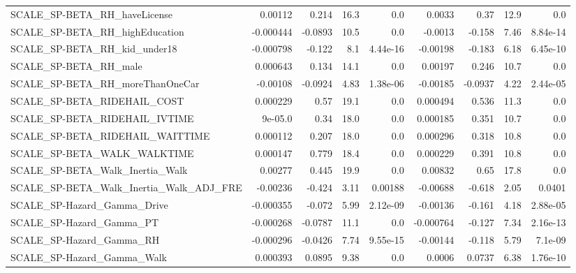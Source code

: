 \begin{tabular}{lrrrrrrrr}
SCALE\_SP-BETA\_RH\_haveLicense                       &     0.00112 &        0.214 &     16.3 &      0.0 &     0.0033 &        0.37 &         12.9 &           0.0 \\
SCALE\_SP-BETA\_RH\_highEducation                     &   -0.000444 &      -0.0893 &     10.5 &      0.0 &    -0.0013 &      -0.158 &         7.46 &      8.84e-14 \\
SCALE\_SP-BETA\_RH\_kid\_under18                       &   -0.000798 &       -0.122 &      8.1 & 4.44e-16 &   -0.00198 &      -0.183 &         6.18 &      6.45e-10 \\
SCALE\_SP-BETA\_RH\_male                              &    0.000643 &        0.134 &     14.1 &      0.0 &    0.00197 &       0.246 &         10.7 &           0.0 \\
SCALE\_SP-BETA\_RH\_moreThanOneCar                    &    -0.00108 &      -0.0924 &     4.83 & 1.38e-06 &   -0.00185 &     -0.0937 &         4.22 &      2.44e-05 \\
SCALE\_SP-BETA\_RIDEHAIL\_COST                        &    0.000229 &         0.57 &     19.1 &      0.0 &   0.000494 &       0.536 &         11.3 &           0.0 \\
SCALE\_SP-BETA\_RIDEHAIL\_IVTIME                      &     9e-05.0 &         0.34 &     18.0 &      0.0 &   0.000185 &       0.351 &         10.7 &           0.0 \\
SCALE\_SP-BETA\_RIDEHAIL\_WAITTIME                    &    0.000112 &        0.207 &     18.0 &      0.0 &   0.000296 &       0.318 &         10.8 &           0.0 \\
SCALE\_SP-BETA\_WALK\_WALKTIME                        &    0.000147 &        0.779 &     18.4 &      0.0 &   0.000229 &       0.391 &         10.8 &           0.0 \\
SCALE\_SP-BETA\_Walk\_Inertia\_Walk                    &     0.00277 &        0.445 &     19.9 &      0.0 &    0.00832 &        0.65 &         17.8 &           0.0 \\
SCALE\_SP-BETA\_Walk\_Inertia\_Walk\_ADJ\_FRE            &    -0.00236 &       -0.424 &     3.11 &  0.00188 &   -0.00688 &      -0.618 &         2.05 &        0.0401 \\
SCALE\_SP-Hazard\_Gamma\_Drive                        &   -0.000355 &       -0.072 &     5.99 & 2.12e-09 &   -0.00136 &      -0.161 &         4.18 &      2.88e-05 \\
SCALE\_SP-Hazard\_Gamma\_PT                           &   -0.000268 &      -0.0787 &     11.1 &      0.0 &  -0.000764 &      -0.127 &         7.34 &      2.16e-13 \\
SCALE\_SP-Hazard\_Gamma\_RH                           &   -0.000296 &      -0.0426 &     7.74 & 9.55e-15 &   -0.00144 &      -0.118 &         5.79 &       7.1e-09 \\
SCALE\_SP-Hazard\_Gamma\_Walk                         &    0.000393 &       0.0895 &     9.38 &      0.0 &     0.0006 &      0.0737 &         6.38 &      1.76e-10 \\
\bottomrule
\end{tabular}
